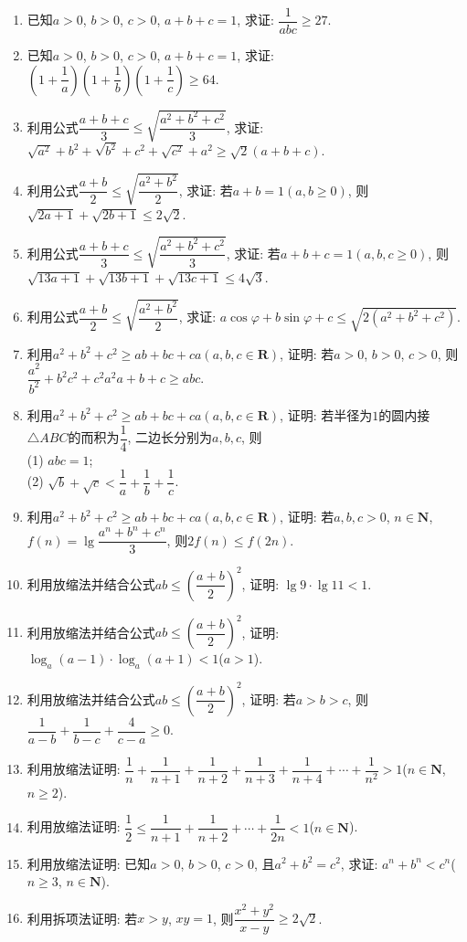 \documentclass[10pt,a4paper]{article}
\begin{document}
\begin{enumerate}[1.]
\item 已知$a>0$, $b>0$, $c>0$, $a+b+c=1$, 求证: $\dfrac 1{abc}\ge 27$.
\item 已知$a>0$, $b>0$, $c>0$, $a+b+c=1$, 求证: $(1+\dfrac 1a)(1+\dfrac 1b)(1+\dfrac 1c)\ge 64$.
\item 利用公式$\dfrac{a+b+c}3\le \sqrt{\dfrac{a^2+b^2+c^2}3}$, 求证: $\sqrt{a^2}+{b^2}+\sqrt{b^2}+{c^2}+\sqrt{c^2}+{a^2}\ge \sqrt 2(a+b+c)$.
\item 利用公式$\dfrac{a+b}2\le \sqrt{\dfrac{a^2+b^2}2}$, 求证: 若$a+b=1(a,b\ge 0)$, 则$\sqrt{2a+1}+\sqrt{2b+1}\le 2\sqrt 2$.
\item 利用公式$\dfrac{a+b+c}3\le \sqrt{\dfrac{a^2+b^2+c^2}3}$, 求证: 若$a+b+c=1(a,b,c\ge 0)$, 则$\sqrt{13a+1}+\sqrt{13b+1}+\sqrt{13c+1}\le 4\sqrt 3$.
\item 利用公式$\dfrac{a+b}2\le \sqrt{\dfrac{a^2+b^2}2}$, 求证: $a\cos \varphi +b\sin \varphi +c\le \sqrt{2(a^2+b^2+c^2)}$.
\item 利用$a^2+b^2+c^2\ge ab+bc+ca(a,b,c\in \mathbf{R})$, 证明: 若$a>0$, $b>0$, $c>0$, 则$\dfrac{a^2}{b^2}+{b^2}{c^2}+{c^2}{a^2}{a+b+c}\ge abc$.
\item 利用$a^2+b^2+c^2\ge ab+bc+ca(a,b,c\in \mathbf{R})$, 证明: 若半径为$1$的圆内接$\triangle ABC$的而积为$\dfrac 14$, 二边长分别为$a,b,c$, 则\\(1) $abc=1$;\\
(2) $\sqrt b+\sqrt c<\dfrac 1a+\dfrac 1b+\dfrac 1c$.
\item 利用$a^2+b^2+c^2\ge ab+bc+ca(a,b,c\in \mathbf{R})$, 证明: 若$a,b,c>0$, $n\in \mathbf{N}$, $f(n)=\lg \dfrac{a^n+b^n+c^n}3$, 则$2f(n)\le f(2n)$.
\item 利用放缩法并结合公式$ab\le (\dfrac{a+b}2)^2$, 证明: $\lg 9\cdot \lg 11<1$.
\item 利用放缩法并结合公式$ab\le (\dfrac{a+b}2)^2$, 证明: $\log_a(a-1)\cdot \log_a(a+1)<1$($a>1$).
\item 利用放缩法并结合公式$ab\le (\dfrac{a+b}2)^2$, 证明: 若$a>b>c$, 则$\dfrac 1{a-b}+\dfrac 1{b-c}+\dfrac 4{c-a}\ge 0$.
\item 利用放缩法证明: $\dfrac 1n+\dfrac 1{n+1}+\dfrac 1{n+2}+\dfrac 1{n+3}+\dfrac 1{n+4}+\cdots +\dfrac 1{n^2}>1$($n\in \mathbf{N}$, $n\ge 2$).
\item 利用放缩法证明: $\dfrac 12\le \dfrac 1{n+1}+\dfrac 1{n+2}+\cdots +\dfrac 1{2n}<1$($n\in \mathbf{N}$).
\item 利用放缩法证明: 已知$a>0$, $b>0$, $c>0$, 且$a^2+b^2=c^2$, 求证: $a^n+b^n<c^n$($n\ge 3$, $n\in \mathbf{N}$).
\item 利用拆项法证明: 若$x>y$, $xy=1$, 则$\dfrac{x^2+y^2}{x-y}\ge 2\sqrt 2$.

\end{enumerate}
\end{document}

